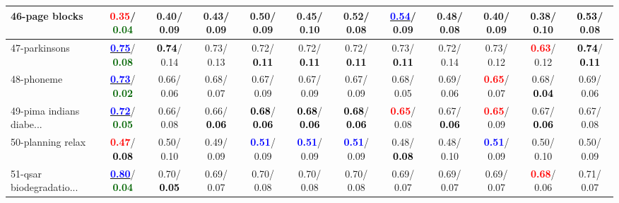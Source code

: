 \begin{table}[h]
\begin{center}
{\begin{tabular}{lc|c|c|c|c|c|c|c|c|c|c}
46-page blocks & \textcolor{red}{\textbf{  0.35}}/\textcolor{darkgreen}{\textbf{  0.04}} &   0.40/  0.09 &   0.43/  0.09 &   0.50/  0.09 &   0.45/  0.10 &   0.52/  0.08 & \underline{\textcolor{blue}{\textbf{  0.54}}}/  0.09 &   0.48/  0.08 &   0.40/  0.09 &   0.38/  0.10 & \textcolor{black}{\textbf{  0.53}}/  0.08 \\ \hline
47-parkinsons & \underline{\textcolor{blue}{\textbf{  0.75}}}/\textcolor{darkgreen}{\textbf{  0.08}} & \textcolor{black}{\textbf{  0.74}}/  0.14 &   0.73/  0.13 &   0.72/\textcolor{black}{\textbf{  0.11}} &   0.72/\textcolor{black}{\textbf{  0.11}} &   0.72/\textcolor{black}{\textbf{  0.11}} &   0.73/\textcolor{black}{\textbf{  0.11}} &   0.72/  0.14 &   0.73/  0.12 & \textcolor{red}{\textbf{  0.63}}/  0.12 & \textcolor{black}{\textbf{  0.74}}/\textcolor{black}{\textbf{  0.11}} \\
48-phoneme & \underline{\textcolor{blue}{\textbf{  0.73}}}/\textcolor{darkgreen}{\textbf{  0.02}} &   0.66/  0.06 &   0.68/  0.07 &   0.67/  0.09 &   0.67/  0.09 &   0.67/  0.09 &   0.68/  0.05 &   0.69/  0.06 & \textcolor{red}{\textbf{  0.65}}/  0.07 &   0.68/\textcolor{black}{\textbf{  0.04}} &   0.69/  0.06 \\
49-pima indians diabe... & \underline{\textcolor{blue}{\textbf{  0.72}}}/\textcolor{darkgreen}{\textbf{  0.05}} &   0.66/  0.08 &   0.66/\textcolor{black}{\textbf{  0.06}} & \textcolor{black}{\textbf{  0.68}}/\textcolor{black}{\textbf{  0.06}} & \textcolor{black}{\textbf{  0.68}}/\textcolor{black}{\textbf{  0.06}} & \textcolor{black}{\textbf{  0.68}}/\textcolor{black}{\textbf{  0.06}} & \textcolor{red}{\textbf{  0.65}}/  0.08 &   0.67/\textcolor{black}{\textbf{  0.06}} & \textcolor{red}{\textbf{  0.65}}/  0.09 &   0.67/\textcolor{black}{\textbf{  0.06}} &   0.67/  0.08 \\
50-planning relax & \textcolor{red}{\textbf{  0.47}}/\textcolor{black}{\textbf{  0.08}} &   0.50/  0.10 &   0.49/  0.09 & \textcolor{blue}{\textbf{  0.51}}/  0.09 & \textcolor{blue}{\textbf{  0.51}}/  0.09 & \textcolor{blue}{\textbf{  0.51}}/  0.09 &   0.48/\textcolor{black}{\textbf{  0.08}} &   0.48/  0.10 & \textcolor{blue}{\textbf{  0.51}}/  0.09 &   0.50/  0.10 &   0.50/  0.09 \\
51-qsar biodegradatio... & \underline{\textcolor{blue}{\textbf{  0.80}}}/\textcolor{darkgreen}{\textbf{  0.04}} &   0.70/\textcolor{black}{\textbf{  0.05}} &   0.69/  0.07 &   0.70/  0.08 &   0.70/  0.08 &   0.70/  0.08 &   0.69/  0.07 &   0.69/  0.07 &   0.69/  0.07 & \textcolor{red}{\textbf{  0.68}}/  0.06 &   0.71/  0.07 \\

\end{tabular}}
\end{center}
\end{table}
